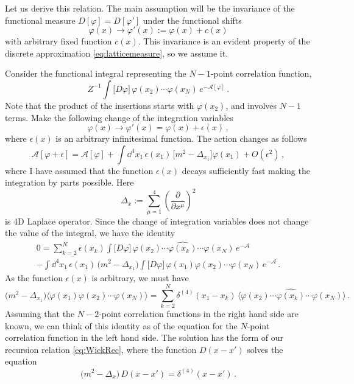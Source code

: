Let us derive this relation. The main assumption will be the invariance of the
functional measure $D[\varphi]=D[\varphi']$ under the functional shifts
\[
\varphi(x)\to\varphi'(x):=\varphi(x)+c(x)
\]
with arbitrary fixed function $c(x)$. This invariance is an evident property
of the discrete approximation \eqref{eq:latticemeasure}, so we assume it.

Consider the functional integral representing the $N-1$-point correlation
function,
\[
Z^{-1}\int\bigl[D\varphi\bigr]\,\varphi(x_2)\cdots\varphi(x_N)\,e^{-\mathcal A[\varphi]}\,.
\]
Note that the product of the insertions starts with $\varphi(x_2)$, and
involves $N-1$ terms. Make the following change of the integration variables
\[
\varphi(x)\to\varphi'(x)=\varphi(x)+\epsilon(x)\,,
\]
where $\epsilon(x)$ is an arbitrary infinitesimal function. The action changes
as follows
\[
\mathcal A[\varphi+\epsilon]=\mathcal A[\varphi]+\int \dd^4x_1\,\epsilon(x_1)\,\bigl[m^2-\Delta_{x_1}\bigr]\varphi(x_1)+O(\epsilon^2)\,,
\]
where I have assumed that the function $\epsilon(x)$ decays sufficiently fast
making the integration by parts possible. Here
\[
\Delta_x:=\sum_{\mu=1}^4\left(\frac{\partial}{\partial x^\mu}\right)^2
\]
is 4D Laplace operator. Since the change of integration variables does not
change the value of the integral, we have the identity
\begin{multline*}
0=\sum_{k=2}^N\epsilon(x_k)\int\bigl[D\varphi\bigr]\,\varphi(x_2)\cdots\widehat{\varphi(x_k)}\cdots\varphi(x_N)\,e^{-\mathcal A}\\
-\int \dd^4x_1\,\epsilon(x_1)\,\bigl(m^2-\Delta_{x_1}\bigr)\int\bigl[D\varphi\bigr]\,\varphi(x_1)\varphi(x_2)\cdots\varphi(x_N)\,e^{-\mathcal A}\,.
\end{multline*}
As the function $\epsilon(x)$ is arbitrary, we must have
\begin{equation}\label{eq:WickSD}
\bigl(m^2-\Delta_{x_1}\bigr)\bigl\langle\varphi(x_1)\varphi(x_2)\cdots\varphi(x_N)\bigr\rangle
=\sum_{k=2}^N\delta^{(4)}(x_1-x_k)\,\bigl\langle\varphi(x_2)\cdots\widehat{\varphi(x_k)}\cdots\varphi(x_N)\bigr\rangle\,.
\end{equation}
Assuming that the $N-2$-point correlation functions in the right hand side are
known, we can think of this identity as of the equation for the $N$-point
correlation function in the left hand side. The solution has the form of our
recursion relation \eqref{eq:WickRec}, where the function $D(x-x')$ solves the
equation
\[
\bigl(m^2-\Delta_x\bigr)\,D(x-x')=\delta^{(4)}(x-x')\,.
\]

